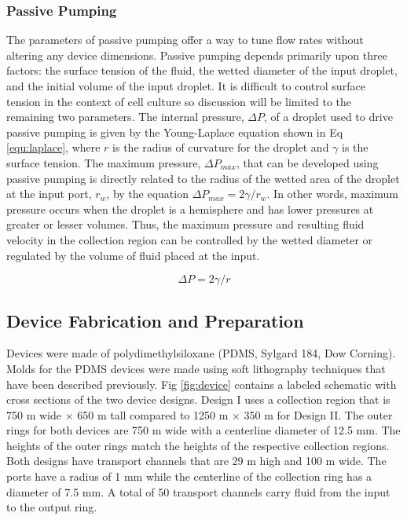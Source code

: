 \subsubsection{Passive Pumping}\label{sec:pp}

The parameters of passive pumping offer a way to tune flow rates without altering any device dimensions. Passive pumping depends primarily upon three factors: the surface tension of the fluid, the wetted diameter of the input droplet, and the initial volume of the input droplet\cite{Berthier:2007mi,Chen:2009df}. It is difficult to control surface tension in the context of cell culture so discussion will be limited to the remaining two parameters. The internal pressure, $\Delta P$, of a droplet used to drive passive pumping is given by the Young-Laplace equation shown in Eq \ref{equ:laplace}, where $r$ is the radius of curvature for the droplet and $\gamma$ is the surface tension. The maximum pressure, $\Delta P_{max}$, that can be developed using passive pumping is directly related to the radius of the wetted area of the droplet at the input port, $r_{w}$, by the equation $\Delta P_{max}=2\gamma / r_{w}$. In other words, maximum pressure occurs when the droplet is a hemisphere and has lower pressures at greater or lesser volumes. Thus, the maximum pressure and resulting fluid velocity in the collection region can be controlled by the wetted diameter or regulated by the volume of fluid placed at the input.

\begin{equation}\label{equ:laplace}
\Delta P = 2 \gamma / r
\end{equation}

\subsection{Device Fabrication and Preparation}

Devices were made of polydimethylsiloxane (PDMS, Sylgard 184, Dow Corning). Molds for the PDMS devices were made using soft lithography techniques that have been described previously\cite{Duffy:1998vj}. Fig \ref{fig:device} contains a labeled schematic with cross sections of the two device designs. Design I uses a collection region that is 750 \textmu m wide $\times$ 650 \textmu m tall compared to 1250 \textmu m $\times$ 350 \textmu m for Design II. The outer rings for both devices are 750 \textmu m wide with a centerline diameter of 12.5 mm. The heights of the outer rings match the heights of the respective collection regions. Both designs have transport channels that are 29 \textmu m high and 100 \textmu m wide. The ports have a radius of 1 mm while the centerline of the collection ring has a diameter of 7.5 mm. A total of 50 transport channels carry fluid from the input to the output ring.

